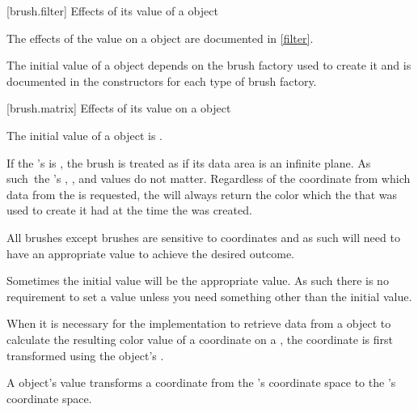 %
%
%
 [brush.filter] {Effects of its  value of a  object}

\pnum
The effects of the  value on a  object are documented in \ref{filter}.

\pnum
The initial  value of a  object depends on the brush factory used to create it and is documented in the  constructors for each type of brush factory.

 [brush.matrix] {Effects of its  value on a  object}

\pnum
The initial  value of a  object is .

\pnum
If the 's  is , the brush is treated as if its data area is an infinite plane. As such\ the 's , , and  values do not matter. Regardless of the coordinate from which data from the  is requested, the  will always return the color which the  that was used to create it had at the time the  was created.

\pnum
All brushes except  brushes are sensitive to coordinates and as such will need to have an appropriate  value to achieve the desired outcome.

\pnum
\enternote
Sometimes the initial  value will be the appropriate value. As such there is no requirement to set a  value unless you need something other than the initial value.
\exitnote

\pnum
When it is necessary for the implementation to retrieve data from a  object to calculate the resulting color value of a coordinate on a , the coordinate is first transformed using the  object's .

\pnum
A  object's  value transforms a coordinate from the 's coordinate space to the 's coordinate space.

